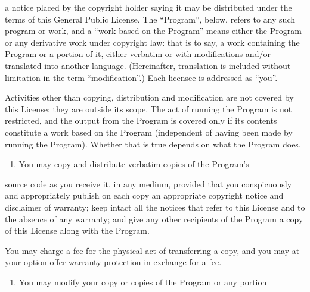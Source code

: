 \documentclass[letterpaper,10pt,english]{sphinxmanual}
\begin{document}
a notice placed by the copyright holder saying it may be distributed
under the terms of this General Public License.  The “Program”, below,
refers to any such program or work, and a “work based on the Program”
means either the Program or any derivative work under copyright law:
that is to say, a work containing the Program or a portion of it,
either verbatim or with modifications and/or translated into another
language.  (Hereinafter, translation is included without limitation in
the term “modification”.)  Each licensee is addressed as “you”.

Activities other than copying, distribution and modification are not
covered by this License; they are outside its scope.  The act of
running the Program is not restricted, and the output from the Program
is covered only if its contents constitute a work based on the
Program (independent of having been made by running the Program).
Whether that is true depends on what the Program does.
\begin{enumerate}
%
\item {} 
You may copy and distribute verbatim copies of the Program’s

\end{enumerate}

source code as you receive it, in any medium, provided that you
conspicuously and appropriately publish on each copy an appropriate
copyright notice and disclaimer of warranty; keep intact all the
notices that refer to this License and to the absence of any warranty;
and give any other recipients of the Program a copy of this License
along with the Program.

You may charge a fee for the physical act of transferring a copy, and
you may at your option offer warranty protection in exchange for a fee.
\begin{enumerate}
%
\setcounter{enumi}{1}
\item {} 
You may modify your copy or copies of the Program or any portion

\end{enumerate}
\end{document}
